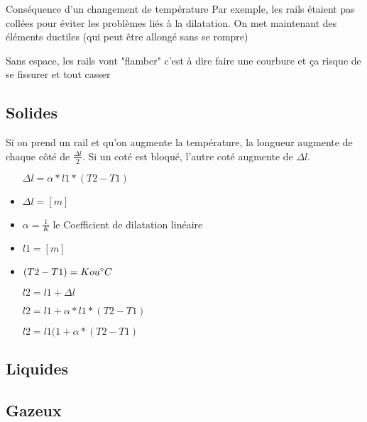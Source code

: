 
Conséquence d'un changement de température
Par exemple, les rails étaient pas collées pour éviter les problèmes liés à la dilatation. On met maintenant des éléments ductiles (qui peut être allongé sans se rompre)

Sans espace, les rails vont "flamber" c'est à dire faire une courbure et ça risque de se fissurer et tout casser

\subsection{Solides}
Si on prend un rail et qu'on augmente la température, la longueur augmente de chaque côté de $\frac{{\Delta}l}{2}$. Si un coté est bloqué, l'autre coté augmente de  ${\Delta}l$.

\begin{itemize}
    \item[${\Delta}l = \alpha * l1 * (T2 - T1)$]
    \item ${\Delta}l = [m]$
    \item $\alpha = \frac{1}{K}$ le Coefficient de dilatation linéaire
    \item $l1 = [m]$
    \item $(T2 - T1) = K ou \celsius$
    \item[$l2 = l1 + {\Delta}l$]
    \item[$l2 = l1 + \alpha * l1 * (T2 - T1)$]
    \item[$l2 = l1 (1+\alpha*(T2-T1)$]
\end{itemize}


\subsection{Liquides}
\subsection{Gazeux}

